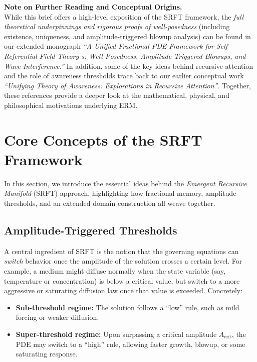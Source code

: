 \documentclass[12pt]{article}
\begin{document}
\medskip

\noindent
\textbf{Note on Further Reading and Conceptual Origins.}\\
While this brief offers a high-level exposition of the SRFT framework, the 
\emph{full theoretical underpinnings and rigorous proofs of well-posedness} 
(including existence, uniqueness, and amplitude-triggered blowup analysis) 
can be found in our extended monograph 
\emph{``A Unified Fractional PDE Framework for Self Referential Field Theory s: 
Well-Posedness, Amplitude-Triggered Blowups, and Wave Interference.''} 
In addition, some of the key ideas behind recursive attention and the role 
of awareness thresholds trace back to our earlier conceptual work 
\emph{``Unifying Theory of Awareness: Explorations in Recursive Attention''}. 
Together, these references provide a deeper look at the mathematical, physical, 
and philosophical motivations underlying ERM.

\section{Core Concepts of the SRFT Framework}

In this section, we introduce the essential ideas behind the \emph{Emergent Recursive
Manifold} (SRFT) approach, highlighting how fractional memory, amplitude thresholds,
and an extended domain construction all weave together.

\subsection{Amplitude-Triggered Thresholds}
A central ingredient of SRFT is the notion that the governing equations can
\emph{switch} behavior once the amplitude of the solution crosses a certain level.
For example, a medium might diffuse normally when the state variable (say,
temperature or concentration) is below a critical value, but switch to a more
aggressive or saturating diffusion law once that value is exceeded. Concretely:

\begin{itemize}
    \item \textbf{Sub-threshold regime:} The solution follows a ``low'' rule,
          such as mild forcing or weaker diffusion.
    \item \textbf{Super-threshold regime:} Upon surpassing a critical amplitude
          $A_{\mathrm{crit}}$, the PDE may switch to a ``high'' rule, allowing
          faster growth, blowup, or some saturating response.
\end{itemize}
\end{document}
